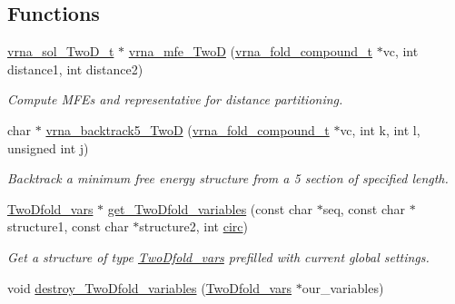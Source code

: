 \subsection*{Functions}
\begin{DoxyCompactItemize}
\item 
\mbox{\hyperlink{group__kl__neighborhood__mfe_structvrna__sol__TwoD__t}{vrna\+\_\+sol\+\_\+\+Two\+D\+\_\+t}} $\ast$ \mbox{\hyperlink{group__kl__neighborhood__mfe_ga243c288b463147352829df04de6a2f77}{vrna\+\_\+mfe\+\_\+\+TwoD}} (\mbox{\hyperlink{group__fold__compound_ga1b0cef17fd40466cef5968eaeeff6166}{vrna\+\_\+fold\+\_\+compound\+\_\+t}} $\ast$vc, int distance1, int distance2)
\begin{DoxyCompactList}\small\item\em Compute M\+FE\textquotesingle{}s and representative for distance partitioning. \end{DoxyCompactList}\item 
char $\ast$ \mbox{\hyperlink{group__kl__neighborhood__mfe_ga15a96fc96f4f4c2e01a11b3e17d1ef43}{vrna\+\_\+backtrack5\+\_\+\+TwoD}} (\mbox{\hyperlink{group__fold__compound_ga1b0cef17fd40466cef5968eaeeff6166}{vrna\+\_\+fold\+\_\+compound\+\_\+t}} $\ast$vc, int k, int l, unsigned int j)
\begin{DoxyCompactList}\small\item\em Backtrack a minimum free energy structure from a 5\textquotesingle{} section of specified length. \end{DoxyCompactList}\item 
\mbox{\hyperlink{group__kl__neighborhood__mfe_structTwoDfold__vars}{Two\+Dfold\+\_\+vars}} $\ast$ \mbox{\hyperlink{group__kl__neighborhood__mfe_gac9284f132cf0eaa0a2f43590eda05488}{get\+\_\+\+Two\+Dfold\+\_\+variables}} (const char $\ast$seq, const char $\ast$structure1, const char $\ast$structure2, int \mbox{\hyperlink{group__model__details_gaf9202a1a09f5828dc731e2d9a10fa111}{circ}})
\begin{DoxyCompactList}\small\item\em Get a structure of type \mbox{\hyperlink{group__kl__neighborhood__mfe_structTwoDfold__vars}{Two\+Dfold\+\_\+vars}} prefilled with current global settings. \end{DoxyCompactList}\item 
void \mbox{\hyperlink{group__kl__neighborhood__mfe_ga05bf4f31d216b1b160fd2d3d68e9b487}{destroy\+\_\+\+Two\+Dfold\+\_\+variables}} (\mbox{\hyperlink{group__kl__neighborhood__mfe_structTwoDfold__vars}{Two\+Dfold\+\_\+vars}} $\ast$our\+\_\+variables)

\end{DoxyCompactItemize}
